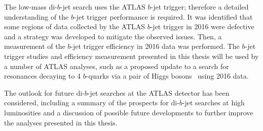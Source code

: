The low-mass di-$b$-jet search uses the ATLAS $b$-jet trigger; therefore a detailed understanding of the $b$-jet trigger performance is required.
It was identified that some regions of data collected by the ATLAS $b$-jet trigger in 2016 were defective
and a strategy was developed to mitigate the observed issues.
Then, a measurement of the $b$-jet trigger efficiency in 2016 data was performed.
The $b$-jet trigger studies and efficiency measurement presented in this thesis will be used by a number of ATLAS analyses,
such as a proposed update to a search for resonances decaying to 4 $b$-quarks via a pair of Higgs bosons~\cite{trig-H4b} using 2016 data.

The outlook for future di-$b$-jet searches at the ATLAS detector has been considered,
including a summary of the prospects for di-$b$-jet searches at high luminosities
and a discussion of possible future developments to further improve the analyses presented in this thesis.


